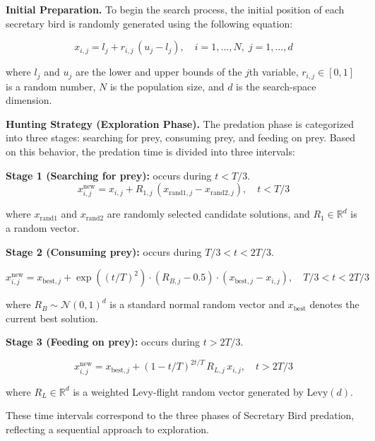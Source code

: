 \documentclass[a4paper,fleqn]{cas-sc}
\begin{document}
\textbf{Initial Preparation.}
To begin the search process, the initial position of each secretary bird is randomly generated using the following equation:

\begin{equation}
x_{i,j} = l_j + r_{i,j}\,(u_j - l_j), \quad i = 1,\ldots,N,\; j = 1,\ldots,d
\end{equation}

where $l_j$ and $u_j$ are the lower and upper bounds of the $j$th variable, $r_{i,j} \in [0,1]$ is a random number, $N$ is the population size, and $d$ is the search-space dimension.


\textbf{Hunting Strategy (Exploration Phase).}
The predation phase is categorized into three stages: searching for prey, consuming prey, and feeding on prey. Based on this behavior, the predation time is divided into three intervals:


\textbf{Stage 1 (Searching for prey):} occurs during $t < T/3$.
\begin{equation}
x_{i,j}^{\mathrm{new}} = x_{i,j} + R_{1,j}\,(x_{\mathrm{rand1},j} - x_{\mathrm{rand2},j}), \quad t < T/3
\end{equation}

where $x_{\mathrm{rand1}}$ and $x_{\mathrm{rand2}}$ are randomly selected candidate solutions, and $R_1 \in \mathbb{R}^{d}$ is a random vector.

\textbf{Stage 2 (Consuming prey):} occurs during $T/3 < t < 2T/3$.

\begin{equation}
x_{i,j}^{\mathrm{new}} = x_{\mathrm{best},j} + \exp\!\left((t/T)^2\right) \cdot (R_{B,j} - 0.5) \cdot (x_{\mathrm{best},j} - x_{i,j}), \quad T/3 < t < 2T/3
\end{equation}

where $R_B \sim \mathcal{N}{(0,1)}^d$ is a standard normal random vector and $x_{\mathrm{best}}$ denotes the current best solution.

\textbf{Stage 3 (Feeding on prey):} occurs during $t > 2T/3$.

\begin{equation}
x_{i,j}^{\mathrm{new}} = x_{\mathrm{best},j} + \left(1 - t/T\right)^{2t/T}\,R_{L,j}\,x_{i,j}, \quad t > 2T/3
\end{equation}

where $R_L \in \mathbb{R}^{d}$ is a weighted Levy-flight random vector generated by $\mathrm{Levy}(d)$.


These time intervals correspond to the three phases of Secretary Bird predation, reflecting a sequential approach to exploration.
\end{document}

